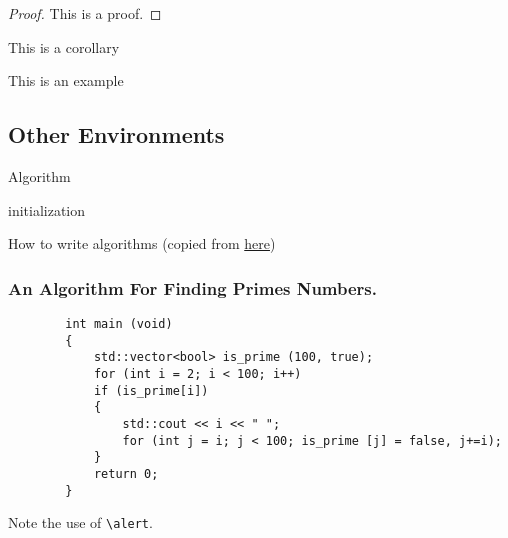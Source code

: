 \begin{frame}
    \begin{proof} 
        This is a proof. 
    \end{proof}
    
    \begin{corollary}
        This is a corollary
    \end{corollary}
    
    \begin{example}
        This is an example 
    \end{example}

\end{frame}

\subsection{Other Environments}

\begin{frame}{Algorithm}
    \scriptsize
    \begin{algorithm}[H]
        initialization\;
        \caption{How to write algorithms
        (copied from \href{https://en.wikibooks.org/wiki/LaTeX/Algorithms}{here})}
        \end{algorithm}
\end{frame}

\begin{frame}[fragile]
    \frametitle{An Algorithm For Finding Primes Numbers.}
    \scriptsize
    \begin{verbatim}
        int main (void)
        {
            std::vector<bool> is_prime (100, true);
            for (int i = 2; i < 100; i++)
            if (is_prime[i])
            {
                std::cout << i << " ";
                for (int j = i; j < 100; is_prime [j] = false, j+=i);
            }
            return 0;
        }
    \end{verbatim}

    \vspace{-0.7cm}

    \begin{uncoverenv}
    Note the use of \verb|\alert|.
    \end{uncoverenv}
\end{frame}

